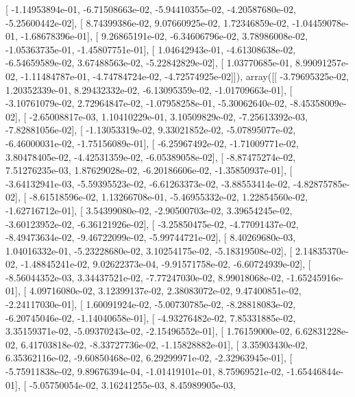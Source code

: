 \documentclass{article}
\begin{document}
       [ -1.14953894e-01,  -6.71508663e-02,  -5.94410355e-02,
         -4.20587680e-02,  -5.25600442e-02],
       [  8.74399386e-02,   9.07660925e-02,   1.72346859e-02,
         -1.04459078e-01,  -1.68678396e-01],
       [  9.26865191e-02,  -6.34606796e-02,   3.78986008e-02,
         -1.05363735e-01,  -1.45807751e-01],
       [  1.04642943e-01,  -4.61308638e-02,  -6.54659589e-02,
          3.67488563e-02,  -5.22842829e-02],
       [  1.03770685e-01,   8.99091257e-02,  -1.11484787e-01,
         -4.74784724e-02,  -4.72574925e-02]]), array([[ -3.79695325e-02,   1.20352339e-01,   8.29432332e-02,
         -6.13095359e-02,  -1.01709663e-01],
       [ -3.10761079e-02,   2.72964847e-02,  -1.07958258e-01,
         -5.30062640e-02,  -8.45358009e-02],
       [ -2.65008817e-03,   1.10410229e-01,   3.10509829e-02,
         -7.25613392e-03,  -7.82881056e-02],
       [ -1.13053319e-02,   9.33021852e-02,  -5.07895077e-02,
         -6.46000031e-02,  -1.75156089e-01],
       [ -6.25967492e-02,  -1.71009771e-02,   3.80478405e-02,
         -4.42531359e-02,  -6.05389058e-02],
       [ -8.87475274e-02,   7.51276235e-03,   1.87629028e-02,
         -6.20186606e-02,  -1.35850937e-01],
       [ -3.64132941e-03,  -5.59395523e-02,  -6.61263373e-02,
         -3.88553414e-02,  -4.82875785e-02],
       [ -8.61518596e-02,   1.13266708e-01,  -5.46955332e-02,
          1.22854560e-02,  -1.62716712e-01],
       [  3.54399080e-02,  -2.90500703e-02,   3.39654245e-02,
         -3.60123952e-02,  -6.36121926e-02],
       [ -3.25850475e-02,  -4.77091437e-02,  -8.49473634e-02,
         -9.46722099e-02,  -5.99744721e-02],
       [  8.40269680e-03,   1.04016332e-01,  -5.23228680e-02,
          3.10254175e-02,  -5.18319508e-02],
       [  2.14835370e-02,  -1.48845241e-02,   9.02622373e-04,
         -9.91571758e-02,  -6.60724939e-02],
       [ -8.56044352e-03,   3.34437521e-02,  -7.77247030e-02,
          8.99018068e-02,  -1.65245916e-01],
       [  4.09716080e-02,   3.12399137e-02,   2.38083072e-02,
          9.47400851e-02,  -2.24117030e-01],
       [  1.60091924e-02,  -5.00730785e-02,  -8.28818083e-02,
         -6.20745046e-02,  -1.14040658e-01],
       [ -4.93276482e-02,   7.85331885e-02,   3.35159371e-02,
         -5.09370243e-02,  -2.15496552e-01],
       [  1.76159000e-02,   6.62831228e-02,   6.41703818e-02,
         -8.33727736e-02,  -1.15828882e-01],
       [  3.35903430e-02,   6.35362116e-02,  -9.60850468e-02,
          6.29299971e-02,  -2.32963945e-01],
       [ -5.75911838e-02,   9.89676394e-04,  -1.01419101e-01,
          8.75969521e-02,  -1.65446844e-01],
       [ -5.05750054e-02,   3.16241255e-03,   8.45989905e-03,
\end{document}
